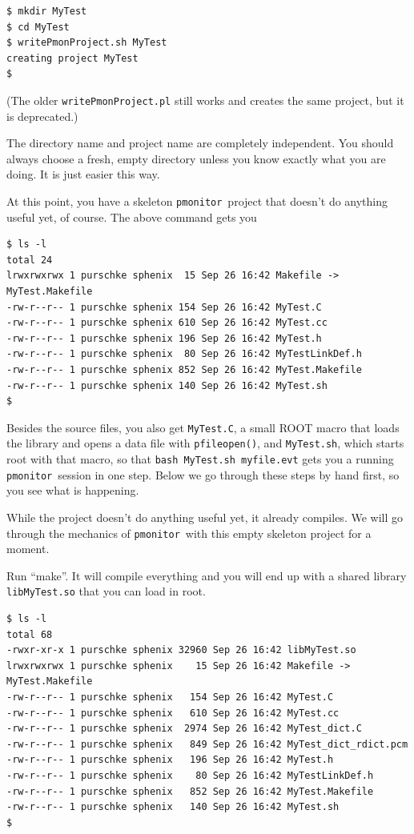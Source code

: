 \documentclass{article}[11pt]
\newcommand{\pmonitor}{{\tt pmonitor}}
\begin{document}
\begin{verbatim}
$ mkdir MyTest
$ cd MyTest
$ writePmonProject.sh MyTest
creating project MyTest
$
\end{verbatim}

(The older \verb|writePmonProject.pl| still works and creates the same
project, but it is deprecated.)

The directory name and project name are completely independent. You
should always choose a fresh, empty directory unless you know exactly
what you are doing. It is just easier this way.

At this point, you have a skeleton \pmonitor\ project that doesn't do
anything useful yet, of course. The above command gets you

\begin{verbatim}
$ ls -l
total 24
lrwxrwxrwx 1 purschke sphenix  15 Sep 26 16:42 Makefile -> MyTest.Makefile
-rw-r--r-- 1 purschke sphenix 154 Sep 26 16:42 MyTest.C
-rw-r--r-- 1 purschke sphenix 610 Sep 26 16:42 MyTest.cc
-rw-r--r-- 1 purschke sphenix 196 Sep 26 16:42 MyTest.h
-rw-r--r-- 1 purschke sphenix  80 Sep 26 16:42 MyTestLinkDef.h
-rw-r--r-- 1 purschke sphenix 852 Sep 26 16:42 MyTest.Makefile
-rw-r--r-- 1 purschke sphenix 140 Sep 26 16:42 MyTest.sh
$
\end{verbatim}

Besides the source files, you also get \verb|MyTest.C|, a small ROOT
macro that loads the library and opens a data file with
\verb|pfileopen()|, and \verb|MyTest.sh|, which starts root with that
macro, so that \verb|bash MyTest.sh myfile.evt| gets you a running
\pmonitor\ session in one step. Below we go through these steps by
hand first, so you see what is happening.

While the project doesn't do anything useful yet, it already
compiles. We will go through the mechanics of \pmonitor\ with this
empty skeleton project for a moment.

Run ``make''. It will compile everything and you will end up with a
shared library \verb|libMyTest.so| that you can load in root.

\begin{verbatim}
$ ls -l
total 68
-rwxr-xr-x 1 purschke sphenix 32960 Sep 26 16:42 libMyTest.so
lrwxrwxrwx 1 purschke sphenix    15 Sep 26 16:42 Makefile -> MyTest.Makefile
-rw-r--r-- 1 purschke sphenix   154 Sep 26 16:42 MyTest.C
-rw-r--r-- 1 purschke sphenix   610 Sep 26 16:42 MyTest.cc
-rw-r--r-- 1 purschke sphenix  2974 Sep 26 16:42 MyTest_dict.C
-rw-r--r-- 1 purschke sphenix   849 Sep 26 16:42 MyTest_dict_rdict.pcm
-rw-r--r-- 1 purschke sphenix   196 Sep 26 16:42 MyTest.h
-rw-r--r-- 1 purschke sphenix    80 Sep 26 16:42 MyTestLinkDef.h
-rw-r--r-- 1 purschke sphenix   852 Sep 26 16:42 MyTest.Makefile
-rw-r--r-- 1 purschke sphenix   140 Sep 26 16:42 MyTest.sh
$
\end{verbatim}
\end{document}
